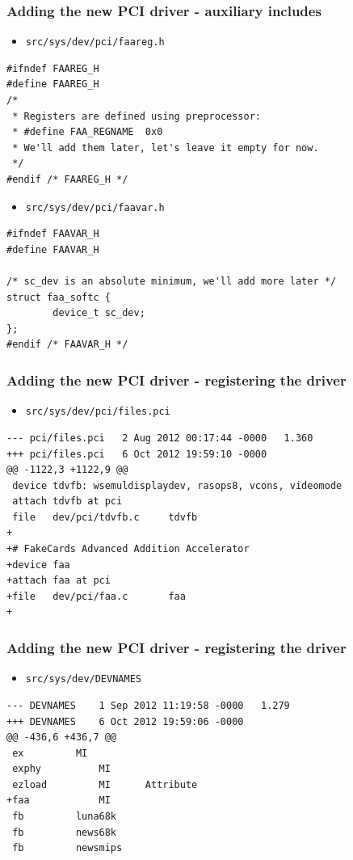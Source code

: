 \documentclass[dvipsnames,table]{beamer}
\begin{document}
\begin{frame}[fragile]
\frametitle{Adding the new PCI driver - auxiliary includes}
\scriptsize
\begin{itemize}
	\item {\tt src/sys/dev/pci/faareg.h}
\end{itemize}
\begin{lstlisting}
#ifndef FAAREG_H
#define FAAREG_H
/* 
 * Registers are defined using preprocessor:
 * #define FAA_REGNAME	0x0
 * We'll add them later, let's leave it empty for now.
 */
#endif /* FAAREG_H */
\end{lstlisting}
\begin{itemize}
	\item {\tt src/sys/dev/pci/faavar.h}
\end{itemize}
\begin{lstlisting}
#ifndef FAAVAR_H
#define FAAVAR_H

/* sc_dev is an absolute minimum, we'll add more later */
struct faa_softc {
        device_t sc_dev;
};
#endif /* FAAVAR_H */
\end{lstlisting}
\end{frame}


\begin{frame}[fragile]
\frametitle{Adding the new PCI driver - registering the driver}
\scriptsize
\begin{itemize}
	\item {\tt src/sys/dev/pci/files.pci}
\end{itemize}
\begin{verbatim}
--- pci/files.pci	2 Aug 2012 00:17:44 -0000	1.360
+++ pci/files.pci	6 Oct 2012 19:59:10 -0000
@@ -1122,3 +1122,9 @@
 device	tdvfb: wsemuldisplaydev, rasops8, vcons, videomode
 attach	tdvfb at pci
 file	dev/pci/tdvfb.c		tdvfb	
+
+# FakeCards Advanced Addition Accelerator
+device	faa
+attach	faa at pci
+file	dev/pci/faa.c		faa	
+
\end{verbatim}
\end{frame}

\begin{frame}[fragile]
\frametitle{Adding the new PCI driver - registering the driver}
\scriptsize
\begin{itemize}
	\item {\tt src/sys/dev/DEVNAMES}
\end{itemize}
\begin{verbatim}
--- DEVNAMES	1 Sep 2012 11:19:58 -0000	1.279
+++ DEVNAMES	6 Oct 2012 19:59:06 -0000
@@ -436,6 +436,7 @@
 ex			MI
 exphy			MI
 ezload			MI		Attribute
+faa			MI
 fb			luna68k
 fb			news68k
 fb			newsmips
\end{verbatim}
\end{frame}
\end{document}
